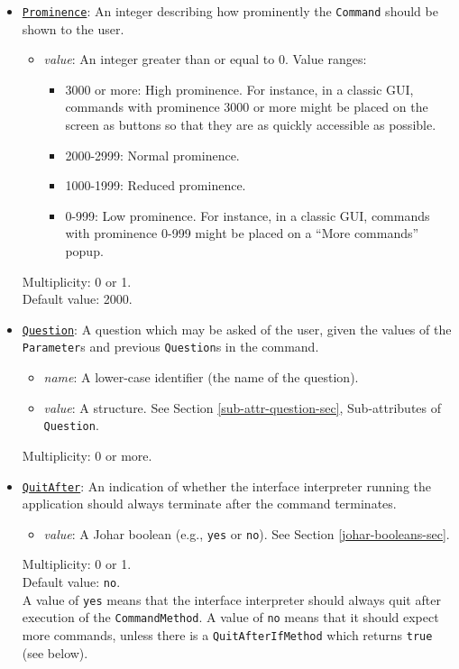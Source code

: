 \documentclass[11pt]{article}
\begin{document}
\begin{itemize}
\item \underline{\tt Prominence}:  An integer describing
how prominently the {\tt Command} should be shown to the user.
\begin{itemize}
\item {\it value}: An integer greater than or equal to 0.  Value ranges:
  \begin{itemize}
  \item 3000 or more:  High prominence.  For instance, in a
    classic GUI, commands
    with prominence 3000 or more might be placed on the screen as
    buttons so that they are as quickly accessible as possible.
  \item 2000-2999:  Normal prominence.
  \item 1000-1999:  Reduced prominence.
  \item 0-999:  Low prominence.  For instance, in a classic GUI,
    commands with prominence 0-999 might be placed on a ``More
    commands'' popup.
  \end{itemize}
\end{itemize}
Multiplicity: 0 or 1. \\
Default value: 2000.

\item \underline{\tt Question}:  A question which may be asked
of the user, given the values of the {\tt Parameter}s and
previous {\tt Question}s in the command.
\begin{itemize}
\item {\it name}: A lower-case identifier (the name of the question).
\item {\it value}: A structure.  See Section
  \ref{sub-attr-question-sec}, Sub-attributes of {\tt Question}.
\end{itemize}
Multiplicity: 0 or more.

\item \underline{\tt QuitAfter}:  An indication of whether the interface
interpreter running the application should always terminate after the
command terminates.
\begin{itemize}
\item {\it value}: A Johar boolean (e.g., \verb/yes/ or \verb/no/).
  See Section \ref{johar-booleans-sec}.
\end{itemize}
Multiplicity: 0 or 1. \\
Default value: \verb/no/. \\
A value of \verb/yes/ means that the interface interpreter should always
quit after execution of the {\tt CommandMethod}.  A value of \verb/no/
means that it should expect more commands, unless there is a
{\tt QuitAfterIfMethod} which returns {\tt true} (see below).


\end{itemize}
\end{document}
